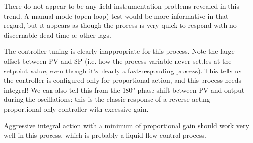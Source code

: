 \vskip 10pt

There do not appear to be any field instrumentation problems revealed in this trend.  A manual-mode (open-loop) test would be more informative in that regard, but it appears as though the process is very quick to respond with no discernable dead time or other lags.

\vskip 10pt
  
The controller tuning is clearly inappropriate for this process.  Note the large offset between PV and SP (i.e. how the process variable never settles at the setpoint value, even though it's clearly a fast-responding process).  This tells us the controller is configured only for proportional action, and this process needs integral!  We can also tell this from the 180$^{o}$ phase shift between PV and output during the oscillations: this is the classic response of a reverse-acting proportional-only controller with excessive gain.

\vskip 10pt

Aggressive integral action with a minimum of proportional gain should work very well in this process, which is probably a liquid flow-control process.











